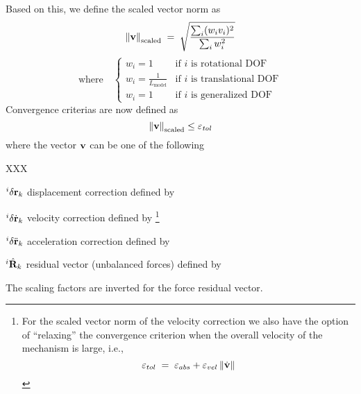 Based on this, we define the scaled vector norm as
%
\begin{equation}
\left\| {\bf v} \right\|_\text{scaled} \;=\;
\sqrt{\frac{\sum_i(w_i v_i)^2}{\sum_i w_i^2}}
\end{equation}
%
\begin{equation*}
\text{where}\quad\left\{\begin{array}{ll}
w_i = 1 & \text{if $i$ is rotational DOF} \\
w_i = \frac{1}{L_\text{model}} & \text{if $i$ is translational DOF} \\
w_i = 1 & \text{if $i$ is generalized DOF}
\end{array}\right.
\end{equation*}
%
Convergence criterias are now defined as
%
\begin{equation}
\left\| {\bf v} \right\|_\text{scaled} \leq \varepsilon_\textit{tol}
\end{equation}
%
where the vector ${\bf v}$ can be one of the following
%
\clearpage
\begin{namelist}{XXX}
%
\item[${}^{i}\delta{\bf r}_k$] displacement correction
defined by 
%
\item[${}^{i}\delta\dot{\bf r}_k$] velocity correction
defined by \footnote{
For the scaled vector norm of the velocity correction we also have the option of
``relaxing'' the convergence criterion when the overall velocity of the
mechanism is large, i.e.,
\begin{equation*}
\varepsilon_{tol} \;=\; \varepsilon_{abs} +
\varepsilon_{vel}\left\|\dot{\bf v}\right\|
\end{equation*}}
%
\item[${}^{i}\delta\ddot{\bf r}_k$] acceleration correction
defined by 
%
\item[${}^{i}\hat{\bf R}_k$] residual vector (unbalanced forces)
defined by 
%
\end{namelist}
%
The scaling factors are inverted for the force residual vector.


